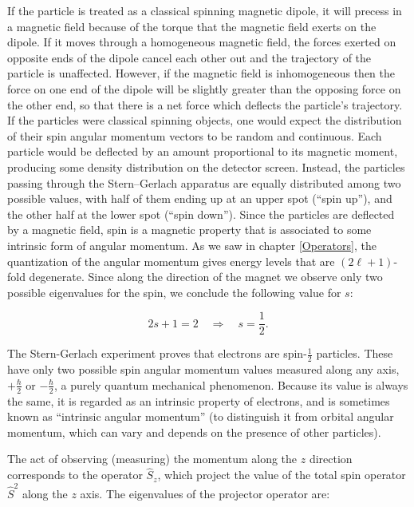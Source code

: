\documentclass[
  9pt,
]{extbook}
\theoremstyle{definition}
\theoremstyle{definition}
\theoremstyle{definition}
\theoremstyle{remark}
\begin{document}
If the particle is treated as a classical spinning magnetic dipole, it will precess in a magnetic field because of the torque that the magnetic field exerts on the dipole. If it moves through a homogeneous magnetic field, the forces exerted on opposite ends of the dipole cancel each other out and the trajectory of the particle is unaffected. However, if the magnetic field is inhomogeneous then the force on one end of the dipole will be slightly greater than the opposing force on the other end, so that there is a net force which deflects the particle's trajectory. If the particles were classical spinning objects, one would expect the distribution of their spin angular momentum vectors to be random and continuous. Each particle would be deflected by an amount proportional to its magnetic moment, producing some density distribution on the detector screen. Instead, the particles passing through the Stern--Gerlach apparatus are equally distributed among two possible values, with half of them ending up at an upper spot (``spin up''), and the other half at the lower spot (``spin down''). Since the particles are deflected by a magnetic field, spin is a magnetic property that is associated to some intrinsic form of angular momentum. As we saw in chapter \ref{Operators}, the quantization of the angular momentum gives energy levels that are \((2\ell+1)\)-fold degenerate. Since along the direction of the magnet we observe only two possible eigenvalues for the spin, we conclude the following value for \(s\):

\begin{equation}
2s+1=2 \quad\Rightarrow\quad s=\frac{1}{2}.
\label{eq:spin0}
\end{equation}

The Stern-Gerlach experiment proves that electrons are spin-\(\frac{1}{2}\) particles. These have only two possible spin angular momentum values measured along any axis, \(+\frac {\hbar }{2}\) or \(-\frac {\hbar }{2}\), a purely quantum mechanical phenomenon. Because its value is always the same, it is regarded as an intrinsic property of electrons, and is sometimes known as ``intrinsic angular momentum'' (to distinguish it from orbital angular momentum, which can vary and depends on the presence of other particles).

The act of observing (measuring) the momentum along the \(z\) direction corresponds to the operator \(\hat{S}_z\), which project the value of the total spin operator \(\hat{S}^2\) along the \(z\) axis. The eigenvalues of the projector operator are:
\end{document}

